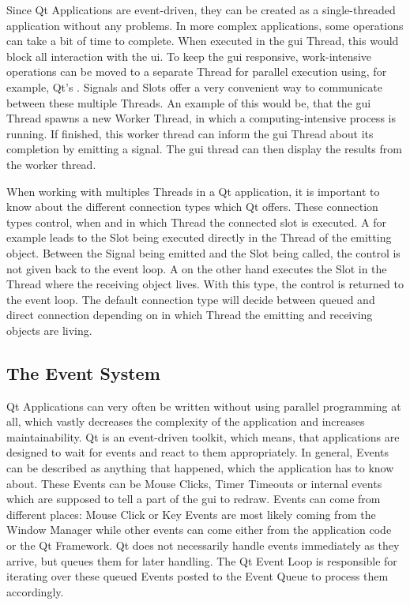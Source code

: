 Since Qt Applications are event-driven, they can be created as a single-threaded
application without any problems. In more complex applications, some operations
can take a bit of time to complete. When executed in the \gls{gui}
Thread, this would block all interaction with the \gls{ui}. To keep the \gls{gui}
responsive, work-intensive operations can be moved to a separate Thread for
parallel execution using, for example, Qt's .
Signals and Slots offer a very convenient way to communicate between these
multiple Threads. An example of this would be, that the \gls{gui} Thread spawns
a new Worker Thread, in which a computing-intensive process is running. If
finished, this worker thread can inform the \gls{gui} Thread about its
completion by emitting a signal. The \gls{gui} thread can then display the
results from the worker thread.

When working with multiples Threads in a Qt application, it is important to know
about the different connection types which Qt offers. These connection types
control, when and in which Thread the connected slot is executed. A
 for example leads to the Slot
being executed directly in the Thread of the emitting object. Between the Signal
being emitted and the Slot being called, the control is not given back to the
event loop. A  on the other hand
executes the Slot in the Thread where the receiving object lives. With this
type, the control is returned to the event loop. The default connection type
 will decide between queued and
direct connection depending on in which Thread the emitting and receiving
objects are living.
\cite{QtConnectionTypes}



\subsection{The Event System}
\label{sec:fundamentals:qt:eventloop}

Qt Applications can very often be written without using parallel programming at
all, which vastly decreases the complexity of the application and increases
maintainability. Qt is an event-driven toolkit, which means, that applications
are designed to wait for events and react to them appropriately. In general,
Events can be described as anything that happened, which the application
has to know about.  These Events can be Mouse Clicks, Timer Timeouts or internal
events which are supposed to tell a part of the \gls{gui} to redraw. Events can
come from different places: Mouse Click or Key Events are most likely
coming from the Window Manager while other events can come either from the
application code or the Qt Framework.
Qt does not necessarily handle events immediately as they arrive, but queues
them for later handling. The Qt Event Loop is responsible for iterating over
these queued Events posted to the Event Queue to process them accordingly.


